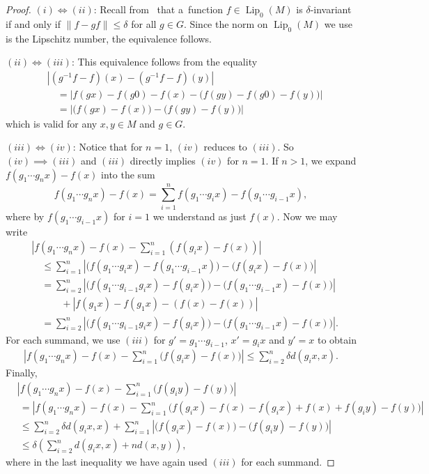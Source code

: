 \documentclass[11pt,a4paper]{amsart}
\theoremstyle{definition}
\newcommand{\abs}[1]{\left| #1 \right|}
\newcommand{\norm}[1]{\left\| #1 \right\|}
\newcommand{\Lipz}{\operatorname{Lip}_0}
\begin{document}
	\begin{proof}
		$(i) \iff (ii)$: Recall from~ that a~function $f \in \Lipz(M)$ is $\delta$-invariant if and only if $\norm{f - gf} \leq \delta$ for all $g \in G$. Since the norm on $\Lipz(M)$ we use is the Lipschitz number, the equivalence follows.
		
		$(ii) \iff (iii)$: This equivalence follows from the equality
		\begin{align*}
			&\abs{(g^{-1}f - f)(x) - (g^{-1}f - f)(y)}\\
			&\quad= \abs{f(gx) - f(g0) - f(x) - \big( f(gy) - f(g0) - f(y) \big)}\\
			&\quad= \abs{\big( f(gx) - f(x) \big) - \big( f(gy) - f(y) \big)}
		\end{align*}
		which is valid for any $x, y \in M$ and $g \in G$.
		
		$(iii) \iff (iv)$: Notice that for $n = 1$, $(iv)$ reduces to $(iii)$. So $(iv) \implies (iii)$ and $(iii)$ directly implies $(iv)$ for $n=1$. If $n > 1$, we expand $f(g_1 \cdots g_n x) - f(x)$ into the sum
		\begin{equation*}
			f(g_1 \cdots g_n x) - f(x)
			= \sum_{i=1}^n f(g_1 \cdots g_ix) - f(g_1 \cdots g_{i-1}x),
		\end{equation*}
		where by $f(g_1 \cdots g_{i-1}x)$ for $i = 1$ we understand as just $f(x)$. Now we may write
		\begin{align*}
			&\abs{f(g_1 \cdots g_n x) - f(x) - \sum_{i=1}^{n} (f(g_ix) - f(x))}\\
			&\quad \leq \sum_{i=1}^{n}\abs{\big(f(g_1 \cdots g_ix) - f(g_1 \cdots g_{i-1}x)\big) - \big(f(g_ix) - f(x)\big)}\\
			&\quad = \sum_{i=2}^{n}\abs{\big(f(g_1 \cdots g_{i-1} g_ix) - f(g_ix)\big) - \big(f(g_1 \cdots g_{i-1}x) - f(x)\big)}\\
			&\hspace{3em}+ \abs{f(g_1x) - f(g_1x) - (f(x) - f(x))}\\
			&\quad = \sum_{i=2}^{n}\abs{\big(f(g_1 \cdots g_{i-1} g_ix) - f(g_ix)\big) - \big(f(g_1 \cdots g_{i-1}x) - f(x)\big)}.
		\end{align*}
		For each summand, we use $(iii)$ for $g' = g_1 \cdots g_{i-1}$, $x' = g_i x$ and $y' = x$ to obtain
		\begin{align*}
			\abs{f(g_1 \cdots g_n x) - f(x) - \sum_{i=1}^{n} \big(f(g_ix) - f(x)\big)}
			\leq \sum_{i=2}^n \delta d(g_i x, x).
		\end{align*}
		Finally,
		\begin{align*}
			&\abs{f(g_1 \cdots g_n x) - f(x) - \sum_{i=1}^{n} \big(f(g_iy) - f(y)\big)} \\
			&\ = \abs{f(g_1 \cdots g_n x) - f(x) - \sum_{i=1}^{n} \big(f(g_ix) - f(x) - f(g_ix) + f(x) + f(g_iy) - f(y)\big) }\\
			&\ \leq \sum_{i=2}^n \delta d(g_i x, x) + \sum_{i=1}^n \abs{\big(f(g_ix) - f(x) \big) - \big(f(g_iy) - f(y) \big)}\\
			&\ \leq \delta \left(\sum_{i=2}^n d(g_i x, x) + nd(x,y)\right),
		\end{align*}
		where in the last inequality we have again used $(iii)$ for each summand.
	\end{proof}
	
\end{document}
